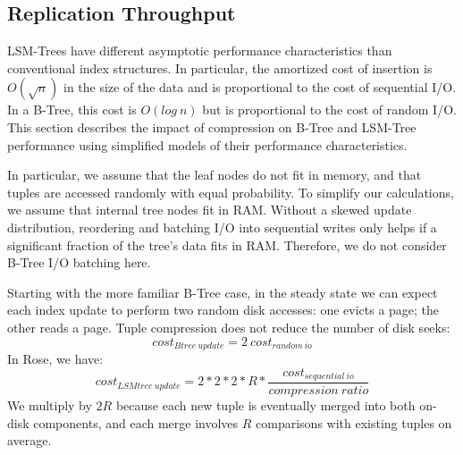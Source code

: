 \documentclass{vldb}
\newcommand{\rows}{Rose\xspace}
\begin{document}

\subsection{Replication Throughput}

LSM-Trees have different asymptotic performance characteristics than
conventional index structures.  In particular, the amortized cost of
insertion is $O(\sqrt{n})$ in the size of the data and is proportional
 to the cost of sequential I/O.  In a B-Tree, this cost is
$O(log~n)$ but is proportional to the cost of random I/O.
This section describes the impact of compression on B-Tree
and LSM-Tree performance using simplified models of
their performance characteristics.

In particular, we assume that the leaf nodes do not fit in memory, and
that tuples are accessed randomly with equal probability.  To simplify
our calculations, we assume that internal tree nodes fit in RAM.
Without a skewed update distribution, reordering and batching I/O into
sequential writes only helps if a significant fraction of the tree's
data fits in RAM.  Therefore, we do not consider B-Tree I/O batching here.

Starting with the more familiar B-Tree case, in the steady state we
can expect each index update to perform two random disk accesses: one
evicts a page; the other reads a page.  Tuple compression does not
reduce the number of disk seeks:
\[
   cost_{Btree~update}=2~cost_{random~io}
\]
In \rows, we have:
\[
   cost_{LSMtree~update}=2*2*2*R*\frac{cost_{sequential~io}}{compression~ratio}  %
\]
We multiply by $2R$ because each new
tuple is eventually merged into both on-disk components, and
each merge involves $R$ comparisons with existing tuples on average.
\end{document}
